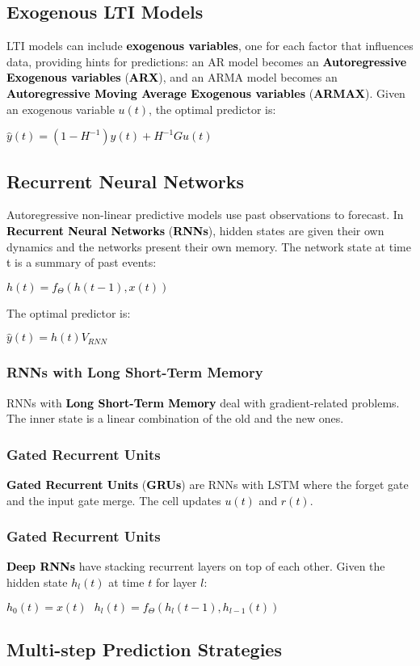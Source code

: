 \documentclass{article}
\newcommand{\bb}[1]{\textcolor{black}{\textbf{#1}}}
\newcommand{\rr}[1]{\textcolor{black}{#1}}
\newcommand{\cc}[1]{\begin{center}\textcolor{black}{#1}\end{center}}
\begin{document}
\subsection{Exogenous LTI Models}
LTI models can include \bb{exogenous variables}, one for each factor that influences data, providing hints for predictions: an AR model becomes an \bb{Autoregressive Exogenous variables} (\bb{ARX}), and an ARMA model becomes an \bb{Autoregressive Moving Average Exogenous variables} (\bb{ARMAX}). Given an exogenous variable \rr{$u(t)$}, the optimal predictor is:
\cc{$\hat{y}(t) = (1 - H^{-1})y(t) + H^{-1}Gu(t)$}

\subsection{Recurrent Neural Networks}
Autoregressive non-linear predictive models use past observations to forecast. In \bb{Recurrent Neural Networks} (\bb{RNNs}), hidden states are given their own dynamics and the networks present their own memory. The network state at time \rr{t} is a summary of past events:
\cc{$h(t) = f_\Theta(h(t-1), x(t))$}
The optimal predictor is:
\cc{$\hat{y}(t)=h(t)V_{RNN}$}
\subsubsection{RNNs with Long Short-Term Memory}
RNNs with \bb{Long Short-Term Memory} deal with gradient-related problems. The inner state is a linear combination of the old and the new ones.
\subsubsection{Gated Recurrent Units}
\bb{Gated Recurrent Units} (\bb{GRUs}) are RNNs with LSTM where the forget gate and the input gate merge. The cell updates \rr{$u(t)$} and \rr{$r(t)$}.
\subsubsection{Gated Recurrent Units}
\bb{Deep RNNs} have stacking recurrent layers on top of each other. Given the hidden state \rr{$h_l(t)$} at time \rr{$t$} for layer \rr{$l$}:
\cc{$h_0(t)=x(t) \ \ \ h_l(t) = f_{\Theta}(h_l(t-1), h_{l-1}(t))$}

\subsection{Multi-step Prediction Strategies}
\end{document}
